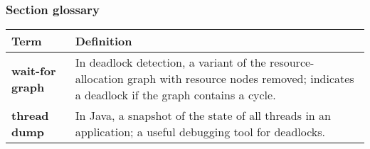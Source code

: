 \subsubsection*{Section glossary}
\begin{tabular}{p{}p{}}
    \toprule
    \textbf{Term} & \textbf{Definition} \\
    \midrule
    \textbf{wait-for graph} & In deadlock detection, a variant of the resource-allocation graph with resource nodes removed; indicates a deadlock if the graph contains a cycle. \\
    \textbf{thread dump} & In Java, a snapshot of the state of all threads in an application; a useful debugging tool for deadlocks. \\
    \bottomrule
\end{tabular}
